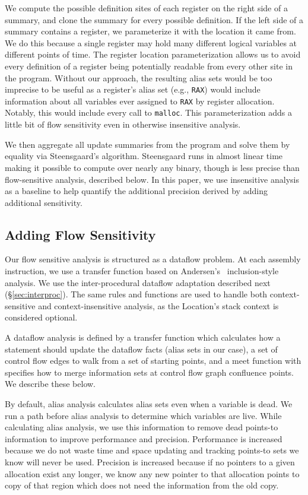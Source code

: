 We compute the possible definition sites of each register on the right side of a summary, and clone the summary for every possible definition.
If the left side of a summary contains a register, we parameterize it with the location it came from.
We do this because a single register may hold many different logical variables at different points of time.
The register location parameterization allows us to avoid every definition of a register being potentially readable from every other site in the program.
Without our approach, the resulting alias sets would be too imprecise to be useful as a register's alias set (e.g., \texttt{RAX}) would include information about all variables ever assigned to \texttt{RAX} by register allocation.
Notably, this would include every call to \texttt{malloc}.
This parameterization adds a little bit of flow sensitivity even in otherwise insensitive analysis.

We then aggregate all update summaries from the program and solve them by equality via Steensgaard's algorithm.
Steensgaard runs  in almost linear time~\cite{steensgaard-alias} making it possible to compute over nearly any binary, though is less precise than flow-sensitive analysis, described below.
In this paper, we use insensitive analysis as a baseline to help quantify the additional precision derived by adding additional sensitivity.




\subsection{Adding Flow Sensitivity}
Our flow sensitive analysis is structured as a dataflow problem.  At each assembly instruction, we use a transfer
function based on Andersen's~\cite{andersen} inclusion-style analysis.
We use the inter-procedural dataflow adaptation described next (\S\ref{sec:interproc}).
The same rules and functions are used to handle both context-sensitive
and context-insensitive analysis, as the Location's stack context is
considered optional.

A dataflow analysis is defined by a transfer function which calculates how a statement should update the dataflow facts
(alias sets in our case),
a set of control flow edges to walk from a set of starting points,
and a meet function with specifies how to merge information sets at control flow graph confluence points.
We describe these below.

By default, alias analysis calculates alias sets even when a variable is dead.
We run a path before alias analysis to determine which variables are live.
While calculating alias analysis, we use this information to remove dead points-to information to improve performance and precision.
Performance is increased because we do not waste time and space updating and tracking points-to
sets we know will never be used.
Precision is increased because if no pointers to a given allocation exist any longer, we know any new pointer to that allocation points to copy of that region which does not need the information from the old copy.

